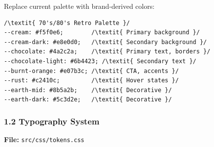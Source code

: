 \documentclass{book}
\begin{document}
Replace current palette with brand-derived colors:

\begin{verbatim}
/\textit{ 70's/80's Retro Palette }/
--cream: #f5f0e6;        /\textit{ Primary background }/
--cream-dark: #e8e0d0;   /\textit{ Secondary background }/
--chocolate: #4a2c2a;    /\textit{ Primary text, borders }/
--chocolate-light: #6b4423; /\textit{ Secondary text }/
--burnt-orange: #e07b3c; /\textit{ CTA, accents }/
--rust: #c2410c;         /\textit{ Hover states }/
--earth-mid: #8b5a2b;    /\textit{ Decorative }/
--earth-dark: #5c3d2e;   /\textit{ Decorative }/

\end{verbatim}

\subsubsection{1.2 Typography System}
\textbf{File:} \texttt{src/css/tokens.css}
\end{document}
